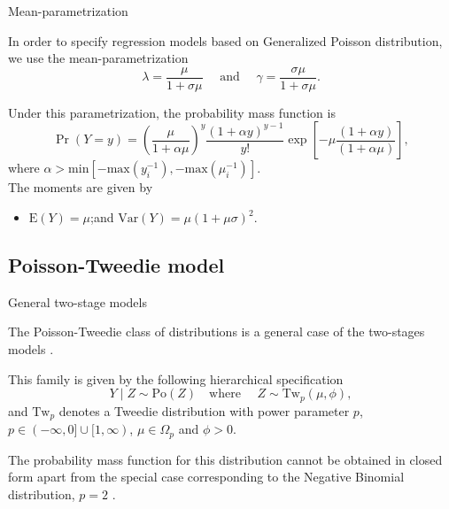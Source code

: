 \documentclass[11pt]{beamer}\usepackage[]{graphicx}\usepackage[]{color}
\begin{document}
\begin{frame}{Mean-parametrization}

  In order to specify regression models based on Generalized Poisson
  distribution, we use the mean-parametrization
  $$
  \lambda = \frac{\mu}{1 + \sigma \mu} \quad \text{ and } \quad
  \gamma = \frac{\sigma \mu}{ 1 + \sigma \mu}.
  $$

  Under this parametrization, the probability mass function is
  \begin{equation*}
  \label{eqn:pmf-gpoisson}
  \Pr(Y=y) = \left ( \frac{\mu}{1+\alpha \mu} \right )^y
    \frac{(1+\alpha y)^{y-1}}{y!}
    \exp \left [ - \mu \frac{(1 + \alpha y)}{( 1 + \alpha \mu)}
    \right ],
  \end{equation*}
  where $\alpha > \text{min}[ -\text{max}(y_i^{-1}),
  -\text{max}(\mu_i^{-1})]$. \\
  The moments are given by\\[0.2cm]
  \begin{itemize}
    \item $\text{E}(Y) = \mu$;\quad and \quad
      $\text{Var}(Y) = \mu (1 + \mu\sigma)^2$.
  \end{itemize}
  \vspace{0.3cm}
\end{frame}

\subsection{Poisson-Tweedie model}

\begin{frame}{General two-stage models}

  The Poisson-Tweedie class of distributions is a general case of the
  two-stages models \citep{Jorgensen1997}.
  \vspace{0.5cm}

  This family is given by the following hierarchical specification
  $$
  Y \mid Z \sim \text{Po}(Z) \quad \text{where } \quad
    Z \sim \text{Tw}_p(\mu, \phi),
  $$
  and $\text{Tw}_p$ denotes a Tweedie distribution with power parameter
  $p$, $p \in (-\infty, 0] \cup [1, \infty)$, $\mu \in \Omega_p$ and
  $\phi > 0$.
  \vspace{0.5cm}

  The probability mass function for this distribution cannot be obtained
  in closed form apart from the special case corresponding to the
  Negative Binomial distribution, $p=2$ \citep{Bonat2018}.

\end{frame}
\end{document}
